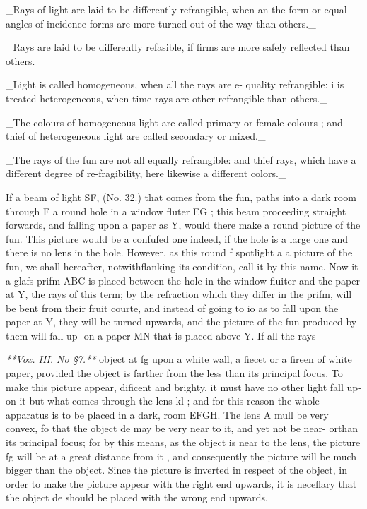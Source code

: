 \documentclass{article}
\begin{document}
\_Rays of light are laid to be differently refrangible, when an the form or equal angles of incidence forms are more turned out of the way than others.\_

\_Rays are laid to be differently refasible, if firms are more safely reflected than others.\_

\_Light is called homogeneous, when all the rays are e- quality refrangible: i is treated heterogeneous, when time rays are other refrangible than others.\_

\_The colours of homogeneous light are called primary or female colours ; and thief of heterogeneous light are called secondary or mixed.\_

\_The rays of the fun are not all equally refrangible: and thief rays, which have a different degree of re-fragibility, here likewise a different colors.\_

If a beam of light SF, (No. 32.) that comes from the fun, paths into a dark room through F a round hole in a window fluter EG ; this beam proceeding straight forwards, and falling upon a paper as Y, would there make a round picture of the fun. This picture would be a confufed one indeed, if the hole is a large one and there is no lens in the hole. However, as this round f spotlight a a picture of the fun, we shall hereafter, notwithflanking its condition, call it by this name. Now it a glafs prifm ABC is placed between the hole in the window-fluiter and the paper at Y, the rays of this term; by the refraction which they differ in the prifm, will be bent from their fruit courte, and instead of going to io as to fall upon the paper at Y, they will be turned upwards, and the picture of the fun produced by them will fall up- on a paper MN that is placed above Y. If all the rays

\textit{**Vox. III. No §7.**}
object at fg upon a white wall, a fiecet or a fireen of white paper, provided the object is farther from the less than its principal focus. To make this picture appear, dificent and brighty, it must have no other light fall up- on it but what comes through the lens kl ; and for this reason the whole apparatus is to be placed in a dark, room EFGH. The lens A mull be very convex, fo that the object de may be very near to it, and yet not be near- orthan its principal focus; for by this means, as the object is near to the lens, the picture fg will be at a great distance from it , and consequently the picture will be much bigger than the object. Since the picture is inverted in respect of the object, in order to make the picture appear with the right end upwards, it is neceflary that the object de should be placed with the wrong end upwards.
\end{document}
